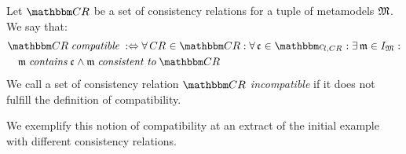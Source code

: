 \begin{definition}[Compatibility] \label{def:compatibility}
    Let $\consistencyrelationset{CR}$ be a set of consistency relations for a tuple of metamodels $\metamodeltuple{M}$.
    We say that:
    \begin{align*}
        &
        \consistencyrelationset{CR} \compatiblemath \equivalentperdefinition
        \forall \consistencyrelation{CR}{} \in \consistencyrelationset{CR} : \forall \conditionelement{c}{} \in \condition{c}{l, \consistencyrelation{CR}{}}: \exists \modeltuple{m} \in \metamodeltupleinstanceset{M} : \\
        & \formulaskip
        \modeltuple{m} \containsmath \conditionelement{c}{} \land \modeltuple{m} \consistenttomath \consistencyrelationset{CR}
    \end{align*}
    We call a set of consistency relation $\consistencyrelationset{CR}$ \emph{incompatible} if it does not fulfill the definition of compatibility.
\end{definition}

We exemplify this notion of compatibility at an extract of the initial example with different consistency relations.

